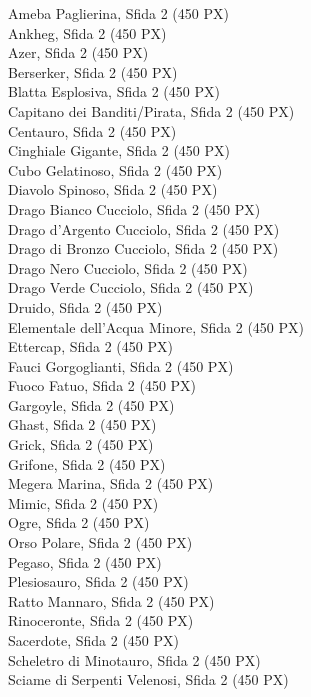 \begin{multicols}{3}
{		Ameba Paglierina, Sfida 2 (450 PX)\\
		Ankheg, Sfida 2 (450 PX)\\
		Azer, Sfida 2 (450 PX)\\
		Berserker, Sfida 2 (450 PX)\\
		Blatta Esplosiva, Sfida 2 (450 PX)\\
		Capitano dei Banditi/Pirata, Sfida 2 (450 PX)\\
		Centauro, Sfida 2 (450 PX)\\
		Cinghiale Gigante, Sfida 2 (450 PX)\\
		Cubo Gelatinoso, Sfida 2 (450 PX)\\
		Diavolo Spinoso, Sfida 2 (450 PX)\\
		Drago Bianco Cucciolo, Sfida 2 (450 PX)\\
		Drago d'Argento Cucciolo, Sfida 2 (450 PX)\\
		Drago di Bronzo Cucciolo, Sfida 2 (450 PX)\\
		Drago Nero Cucciolo, Sfida 2 (450 PX)\\
		Drago Verde Cucciolo, Sfida 2 (450 PX)\\
		Druido, Sfida 2 (450 PX)\\
		Elementale dell'Acqua Minore, Sfida 2 (450 PX)\\
		Ettercap, Sfida 2 (450 PX)\\
		Fauci Gorgoglianti, Sfida 2 (450 PX)\\
		Fuoco Fatuo, Sfida 2 (450 PX)\\
		Gargoyle, Sfida 2 (450 PX)\\
		Ghast, Sfida 2 (450 PX)\\
		Grick, Sfida 2 (450 PX)\\
		Grifone, Sfida 2 (450 PX)\\
		Megera Marina, Sfida 2 (450 PX)\\
		Mimic, Sfida 2 (450 PX)\\
		Ogre, Sfida 2 (450 PX)\\
		Orso Polare, Sfida 2 (450 PX)\\
		Pegaso, Sfida 2 (450 PX)\\
		Plesiosauro, Sfida 2 (450 PX)\\
		Ratto Mannaro, Sfida 2 (450 PX)\\
		Rinoceronte, Sfida 2 (450 PX)\\
		Sacerdote, Sfida 2 (450 PX)\\
		Scheletro di Minotauro, Sfida 2 (450 PX)\\
		Sciame di Serpenti Velenosi, Sfida 2 (450 PX)\\
}
\end{multicols}
